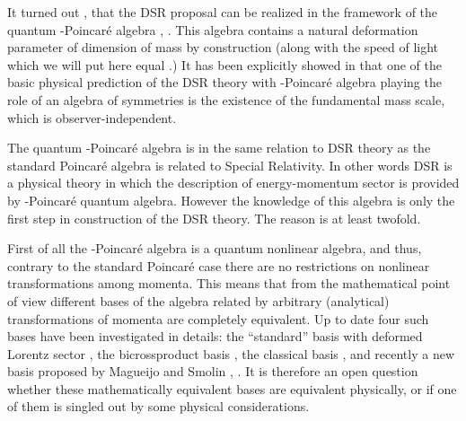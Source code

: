 \documentclass [prd,twocolumn,nofootinbib,showpacs]  {revtex4}
\begin{document}
It turned out \cite{jkgminl}, \cite{rbgacjkg} that the DSR
proposal can be realized in the  framework of the quantum
\myHighlight{$\kappa$}\coordHE{}-Poincar\'e  algebra \cite{lunoruto}, \cite{maru}. This
algebra  contains a natural deformation parameter of dimension of
mass \myHighlight{$\kappa$}\coordHE{} by construction (along with the speed of light \coordHE{}
which we will put here equal \coordHE{}.) It has been explicitly showed
in \cite{rbgacjkg} that one of the basic physical prediction of
the DSR theory with \myHighlight{$\kappa$}\coordHE{}-Poincar\'e  algebra  playing the role
of an algebra of symmetries is the existence of the fundamental
mass scale, which is observer-independent.

The quantum \myHighlight{$\kappa$}\coordHE{}-Poincar\'e  algebra is in the same relation
to DSR theory as  the standard Poincar\'e  algebra is related to
Special Relativity. In other words DSR is a physical theory in
which the description of  energy-momentum sector is provided by
\myHighlight{$\kappa$}\coordHE{}-Poincar\'e quantum algebra. However the knowledge of this
algebra is only the first step in construction of the DSR theory.
The reason is at least twofold.

First of all the \myHighlight{$\kappa$}\coordHE{}-Poincar\'e  algebra is a quantum
nonlinear algebra, and thus,  contrary to the standard Poincar\'e
case there are no restrictions on nonlinear transformations among
momenta. This means that from the mathematical point of view
different bases of the algebra related by arbitrary (analytical)
transformations of momenta are completely equivalent. Up to date
four such bases have been investigated in details: the
``standard'' basis with deformed Lorentz sector \cite{lunoruto},
the bicrossproduct basis \cite{maru}, the classical basis
\cite{kolumaso}, and recently a new basis proposed by Magueijo and
Smolin \cite{JoaoLee}, \cite{juse}. It is therefore an open
question whether these mathematically equivalent bases are
equivalent physically, or if one of them is singled out by some
physical considerations.
\end{document}
